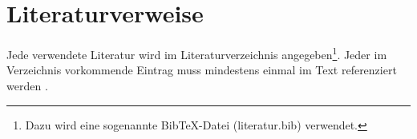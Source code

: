 \section{Literaturverweise}

Jede verwendete Literatur wird im Literaturverzeichnis angegeben\footnote{Dazu wird eine sogenannte BibTeX-Datei (literatur.bib) verwendet.}. Jeder im Verzeichnis vorkommende Eintrag muss mindestens einmal im Text referenziert werden \cite{Cormen:90}.
